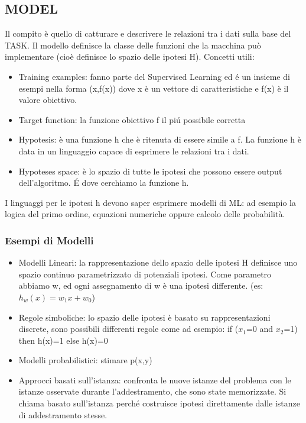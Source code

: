 \documentclass{article}
\begin{document}
\subsection{MODEL}
Il compito è quello di catturare e descrivere le relazioni tra i dati sulla base del TASK. Il modello definisce la classe delle funzioni che la macchina può implementare (cioè definisce lo spazio delle ipotesi H). \newline
Concetti utili: 
\begin{itemize}
    \item Training examples: fanno parte del Supervised Learning ed é un insieme di esempi nella forma (x,f(x)) dove x è un vettore di caratteristiche e f(x) è il valore obiettivo.
    \item Target function: la funzione obiettivo f il piú possibile corretta
    \item Hypotesis: è una funzione h che è ritenuta di essere simile a f. La funzione h è data in un linguaggio capace di esprimere le relazioni tra i dati.
    \item Hypoteses space: è lo spazio di tutte le ipotesi che possono essere output dell'algoritmo. É dove cerchiamo la funzione h. 
\end{itemize}
I linguaggi per le ipotesi h devono saper esprimere modelli di ML: ad esempio la logica del primo ordine, equazioni numeriche oppure calcolo delle probabilità.

\subsubsection{Esempi di Modelli}
\begin{itemize}
    \item Modelli Lineari: la rappresentazione dello spazio delle ipotesi H definisce uno spazio continuo parametrizzato di potenziali ipotesi. Come parametro abbiamo w, ed ogni assegnamento di w è una ipotesi differente. (es: $h_w(x)=w_1x+w_0$)
    \item Regole simboliche: lo spazio delle ipotesi è basato su rappresentazioni discrete, sono possibili differenti regole come ad esempio: if ($x_1$=0 and $x_2$=1) then h(x)=1 else h(x)=0
    \item Modelli probabilistici: stimare p(x,y)
    \item Approcci basati sull'istanza: confronta le nuove istanze del problema con le istanze osservate durante l'addestramento, che sono state memorizzate. Si chiama basato sull'istanza perché costruisce ipotesi direttamente dalle istanze di addestramento stesse.
\end{itemize}
\end{document}
